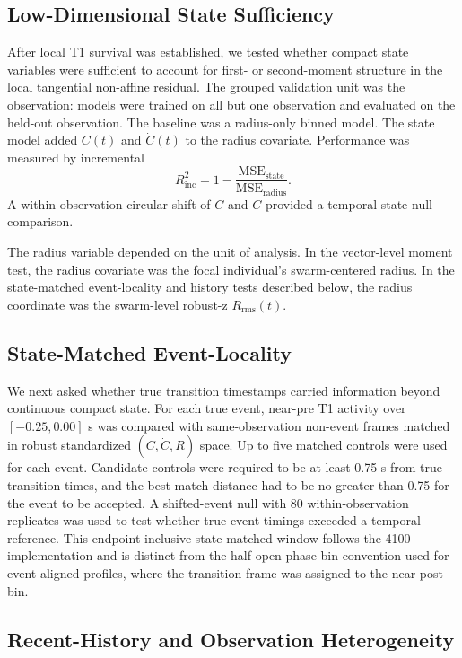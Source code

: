 \subsection{Low-Dimensional State Sufficiency}

After local T1 survival was established, we tested whether compact state
variables were sufficient to account for first- or second-moment structure in
the local tangential non-affine residual. The grouped validation unit was the
observation: models were trained on all but one observation and evaluated on
the held-out observation. The baseline was a radius-only binned model. The
state model added $C(t)$ and $\dot{C}(t)$ to the radius covariate. Performance
was measured by incremental
\begin{equation}
R^2_{\mathrm{inc}}
=
1-
\frac{\mathrm{MSE}_{\mathrm{state}}}{\mathrm{MSE}_{\mathrm{radius}}}.
\end{equation}
A within-observation circular shift of $C$ and $\dot{C}$ provided a temporal
state-null comparison.

The radius variable depended on the unit of analysis. In the vector-level
moment test, the radius covariate was the focal individual's swarm-centered
radius. In the state-matched event-locality and history tests described below,
the radius coordinate was the swarm-level robust-z $R_{\mathrm{rms}}(t)$.

\subsection{State-Matched Event-Locality}

We next asked whether true transition timestamps carried information beyond
continuous compact state. For each true event, near-pre T1 activity over
$[-0.25,0.00]$ s was compared with same-observation non-event frames matched
in robust standardized $(C,\dot{C},R)$ space. Up to five matched controls were
used for each event. Candidate controls were required to be at least 0.75 s
from true transition times, and the best match distance had to be no greater
than 0.75 for the event to be accepted. A shifted-event null with 80
within-observation replicates was used to test whether true event timings
exceeded a temporal reference.
This endpoint-inclusive state-matched window follows the 4100 implementation
and is distinct from the half-open phase-bin convention used for event-aligned
profiles, where the transition frame was assigned to the near-post bin.

\subsection{Recent-History and Observation Heterogeneity}

